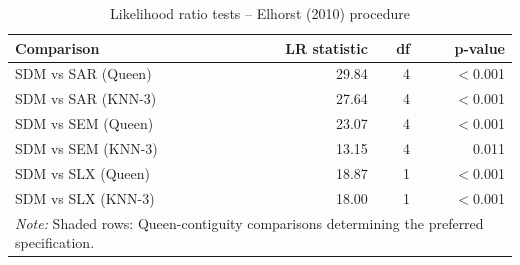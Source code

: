 \begin{table}[ht]
\centering
\caption{Likelihood ratio tests -- Elhorst (2010) procedure} 
\label{tab:lr_tests}
\begin{tabular}{lrrr}
  \toprule
Comparison & LR statistic & df & p-value \\ 
  \midrule
\rowcolor{gray!15}SDM vs SAR (Queen) & 29.84 & 4 & $<$0.001 \\
  SDM vs SAR (KNN-3) & 27.64 & 4 & $<$0.001 \\
  \rowcolor{gray!15}SDM vs SEM (Queen) & 23.07 & 4 & $<$0.001 \\
  SDM vs SEM (KNN-3) & 13.15 & 4 & 0.011 \\
  \rowcolor{gray!15}SDM vs SLX (Queen) & 18.87 & 1 & $<$0.001 \\
  SDM vs SLX (KNN-3) & 18.00 & 1 & $<$0.001 \\
   \bottomrule
\multicolumn{4}{l}{\footnotesize \textit{Note:} Shaded rows: Queen-contiguity comparisons determining the preferred specification.}
\end{tabular}
\end{table}
